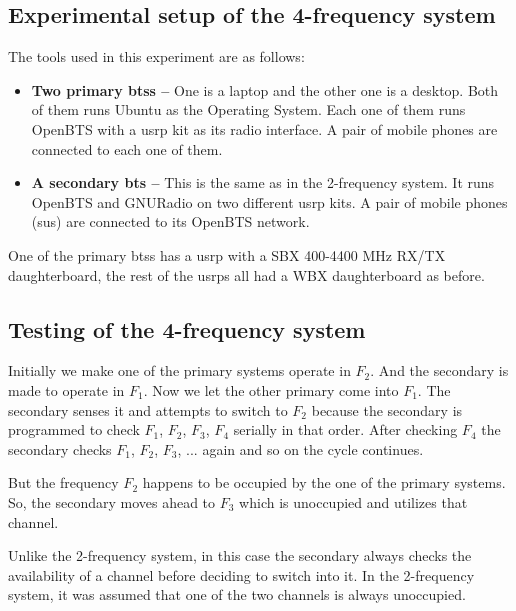 \subsection{Experimental setup of the 4-frequency system}
The tools used in this experiment are as follows:
\begin{itemize}
    \item \textbf{Two primary \glspl{bts} --} One is a laptop and the other one is a
    desktop. Both of them runs Ubuntu as the Operating System. Each one of
    them runs OpenBTS with a \gls{usrp} kit as its radio interface. A pair of mobile
    phones are connected to each one of them.
    \item \textbf{A secondary \gls{bts} --} This is the same as in the 
    2-frequency system. It runs OpenBTS and GNURadio on two different \gls{usrp}
    kits. A pair of mobile phones (\glspl{su}) are connected to its
    OpenBTS network.
\end{itemize}

One of the primary \glspl{bts} has a \gls{usrp} with a SBX 400-4400 MHz RX/TX 
daughterboard, the rest of the \glspl{usrp} all had a WBX daughterboard as before.

\subsection{Testing of the 4-frequency system}

Initially we make one of the primary systems operate in $F_2$. And the 
secondary is made to operate in $F_1$. Now we let the other primary come into 
$F_1$. The secondary senses it and attempts to switch to $F_2$ because the 
secondary is programmed to check $F_1$, $F_2$, $F_3$, $F_4$ serially in that 
order. After checking $F_4$ the secondary checks $F_1$, $F_2$, $F_3$, ... 
again and so on the cycle continues.

But the frequency $F_2$ happens to be occupied by the one of the primary 
systems. So, the secondary moves ahead to $F_3$ which is unoccupied and 
utilizes that channel.

Unlike the 2-frequency system, in this case the secondary always checks 
the availability of a channel before deciding to switch into it. In the 
2-frequency system, it was assumed that one of the two channels is always
unoccupied.

